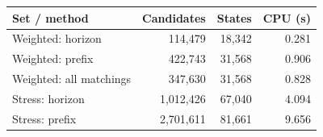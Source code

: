 \begin{tabular}{lrrr}
\toprule Set / method & Candidates & States & CPU (s) \\
\midrule
Weighted: horizon & 114,479 & 18,342 & 0.281 \\
Weighted: prefix & 422,743 & 31,568 & 0.906 \\
Weighted: all matchings & 347,630 & 31,568 & 0.828 \\
\midrule
Stress: horizon & 1,012,426 & 67,040 & 4.094 \\
Stress: prefix & 2,701,611 & 81,661 & 9.656 \\
\bottomrule
\end{tabular}
